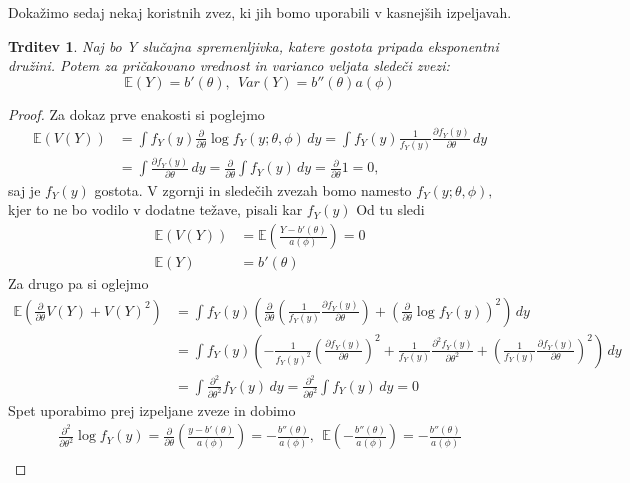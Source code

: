 \documentclass[12pt,a4paper]{amsart}
\theoremstyle{definition} %
\theoremstyle{plain} %
\newtheorem{trditev}[definicija]{Trditev}
\begin{document}
Dokažimo sedaj nekaj koristnih zvez, ki jih bomo uporabili v kasnejših izpeljavah.
\begin{trditev} \label{izp}
    Naj bo Y slučajna spremenljivka, katere gostota pripada eksponentni družini. Potem za pričakovano vrednost in varianco veljata sledeči zvezi:
    \[
        \mathbb{E}(Y) = b'(\theta),~~Var(Y) = b''(\theta)a(\phi)
    \]
\end{trditev}
\begin{proof}
Za dokaz prve enakosti si poglejmo
\begin{align*}
    \mathbb{E}(V(Y)) &= \int f_{Y}(y)\frac{\partial}{\partial \theta}\log f_{Y}(y;\theta,\phi) \,dy = \int f_{Y}(y)\frac{1}{f_{Y}(y)}\frac{\partial f_{Y}(y)}{\partial\theta}\,dy \nonumber\\
    &=\int\frac{\partial f_{Y}(y)}{\partial \theta} \,dy= \frac{\partial}{\partial \theta}\int f_{Y}(y)\,dy = \frac{\partial}{\partial \theta}1 = 0,
\end{align*}
saj je $f_{Y}(y)$ gostota. V zgornji in sledečih zvezah bomo namesto $f_{Y}(y;\theta,\phi),$ kjer to ne bo vodilo v dodatne težave, pisali kar $f_{Y}(y)$
Od tu sledi
\begin{align*}
    \mathbb{E}(V(Y)) &= \mathbb{E}(\frac{Y - b'(\theta)}{a(\phi)}) = 0 \\
    \mathbb{E}(Y) &= b'(\theta)
\end{align*}
Za drugo pa si oglejmo
\begin{align*}
    \mathbb{E}(\frac{\partial}{\partial\theta}V(Y) + V(Y)^2) &= \int f_{Y}(y)\left(\frac{\partial}{\partial \theta} \left(\frac{1}{f_{Y}(y)}\frac{\partial f_{Y}(y)}{\partial\theta}\right) + \left(\frac{\partial}{\partial\theta}\log f_{Y}(y)\right)^2\right) \,dy \\
    &=\int f_{Y}(y)\left(-\frac{1}{f_{Y}(y)^2}\left(\frac{\partial f_{Y}(y)}{\partial\theta}\right)^2 + \frac{1}{f_{Y}(y)}\frac{\partial^2f_{Y}(y)}{\partial\theta^2} + \left(\frac{1}{f_{Y}(y)}\frac{\partial f_{Y}(y)}{\partial\theta}\right)^2  \right)\,dy\\    
    &=\int \frac{\partial^2}{\partial\theta^2} f_{Y}(y) \,dy = \frac{\partial^2}{\partial\theta^2}\int f_{Y}(y)\,dy = 0
\end{align*}
Spet uporabimo prej izpeljane zveze in dobimo
\begin{gather*}
    \frac{\partial^2}{\partial\theta^2}\log f_{Y}(y) = \frac{\partial}{\partial\theta}\left(\frac{y-b'(\theta)}{a(\phi)}\right) = -\frac{b''(\theta)}{a(\phi)},~~\mathbb{E}\left(-\frac{b''(\theta)}{a(\phi)}\right) = -\frac{b''(\theta)}{a(\phi)} \\

\end{gather*}
\end{proof}
\end{document}
